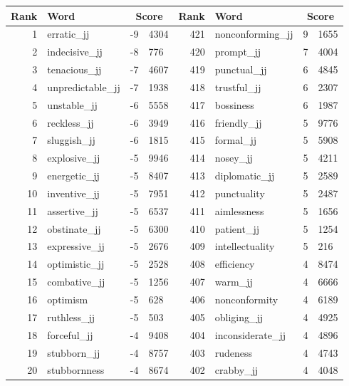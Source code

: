 \begin{table}[tbp]
    \begin{tabular}{| rlr@{.}l | rlr@{.}l |}
    \hline
    \textbf{Rank} & \textbf{Word} & \multicolumn{2}{c|}{\textbf{Score}} & \textbf{Rank} & \textbf{Word} & \multicolumn{2}{c|}{\textbf{Score}} \\
    \hline
    1 & erratic\_jj & -9 & 4304    &    421 & nonconforming\_jj & 9 & 1655 \\
    2 & indecisive\_jj & -8 & 776    &    420 & prompt\_jj & 7 & 4004 \\
    3 & tenacious\_jj & -7 & 4607    &    419 & punctual\_jj & 6 & 4845 \\
    4 & unpredictable\_jj & -7 & 1938    &    418 & trustful\_jj & 6 & 2307 \\
    5 & unstable\_jj & -6 & 5558    &    417 & bossiness & 6 & 1987 \\
    6 & reckless\_jj & -6 & 3949    &    416 & friendly\_jj & 5 & 9776 \\
    7 & sluggish\_jj & -6 & 1815    &    415 & formal\_jj & 5 & 5908 \\
    8 & explosive\_jj & -5 & 9946    &    414 & nosey\_jj & 5 & 4211 \\
    9 & energetic\_jj & -5 & 8407    &    413 & diplomatic\_jj & 5 & 2589 \\
    10 & inventive\_jj & -5 & 7951    &    412 & punctuality & 5 & 2487 \\
    11 & assertive\_jj & -5 & 6537    &    411 & aimlessness & 5 & 1656 \\
    12 & obstinate\_jj & -5 & 6300    &    410 & patient\_jj & 5 & 1254 \\
    13 & expressive\_jj & -5 & 2676    &    409 & intellectuality & 5 & 216 \\
    14 & optimistic\_jj & -5 & 2528    &    408 & efficiency & 4 & 8474 \\
    15 & combative\_jj & -5 & 1256    &    407 & warm\_jj & 4 & 6666 \\
    16 & optimism & -5 & 628    &    406 & nonconformity & 4 & 6189 \\
    17 & ruthless\_jj & -5 & 503    &    405 & obliging\_jj & 4 & 4925 \\
    18 & forceful\_jj & -4 & 9408    &    404 & inconsiderate\_jj & 4 & 4896 \\
    19 & stubborn\_jj & -4 & 8757    &    403 & rudeness & 4 & 4743 \\
    20 & stubbornness & -4 & 8674    &    402 & crabby\_jj & 4 & 4048 \\

\end{tabular}
\end{table}
